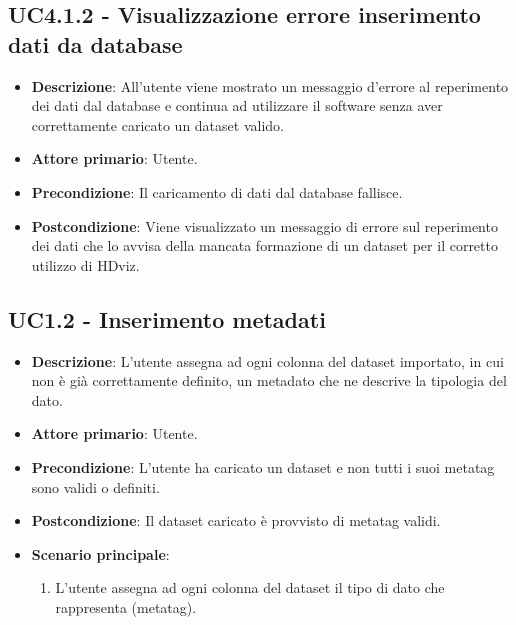 \subsection{UC4.1.2 - Visualizzazione errore inserimento dati da database}
\begin{itemize}
    \item \textbf{Descrizione}: All'utente viene mostrato un messaggio d'errore al reperimento
                                dei dati dal database e continua ad utilizzare 
                                il software senza aver correttamente caricato un dataset valido.

    \item \textbf{Attore primario}: Utente.
    
    \item \textbf{Precondizione}:   Il caricamento di dati dal database fallisce.

    \item \textbf{Postcondizione}:  Viene visualizzato un messaggio di errore sul reperimento dei 
                                    dati che lo avvisa della mancata formazione di un dataset per il
                                    corretto utilizzo di HDviz.

\end{itemize}



\subsection{UC1.2 - Inserimento metadati}
\begin{itemize}
    \item \textbf{Descrizione}: L'utente assegna ad ogni colonna del dataset importato,
                                in cui non è già correttamente definito,
                                un metadato che ne descrive la tipologia del dato.


    \item \textbf{Attore primario}: Utente.
    
    \item \textbf{Precondizione}:   L'utente ha caricato un dataset e non tutti i suoi 
                                    metatag sono validi o definiti.

    \item \textbf{Postcondizione}:  Il dataset caricato è provvisto di metatag validi. 

	\item \textbf{Scenario principale}:
		\begin{enumerate}
			\item L'utente assegna ad ogni colonna del dataset il tipo di dato che rappresenta (metatag).
        \end{enumerate}

\end{itemize}

